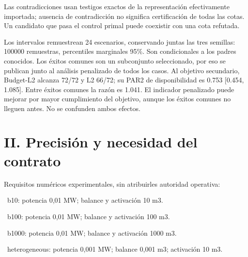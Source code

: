 \documentclass[a4paper,10pt]{article}
\begin{document}
Las contradicciones usan testigos exactos de la representación efectivamente
importada; ausencia de contradicción no significa certificación de todas
las cotas. Un candidato que pasa el control primal puede coexistir con
una cota refutada.

\begin{center}\small{}\end{center}

Los intervalos remuestrean 24 escenarios, conservando juntas las tres semillas:
100000 remuestras, percentiles marginales 95\%. Son condicionales a los
padres conocidos. Los éxitos comunes son un subconjunto seleccionado,
por eso se publican junto al análisis penalizado de todos los casos.
Al objetivo secundario, Budget-L2 alcanza 72/72 y L2 66/72;
su PAR2 de disponibilidad es 0.753 [0.454, 1.085].
Entre éxitos comunes la razón es 1.041.
El indicador penalizado puede mejorar por mayor cumplimiento del objetivo,
aunque los éxitos comunes no lleguen antes. No se confunden ambos efectos.

\section*{II. Precisión y necesidad del contrato}

Requisitos numéricos experimentales, sin atribuirles autoridad operativa:

\noindent\textbullet\ b10: potencia 0,01 MW; balance y activación 10 m3.\par
\noindent\textbullet\ b100: potencia 0,01 MW; balance y activación 100 m3.\par
\noindent\textbullet\ b1000: potencia 0,01 MW; balance y activación 1000 m3.\par
\noindent\textbullet\ heterogeneous: potencia 0,001 MW; balance 0,001 m3; activación 10 m3.\par
\end{document}
